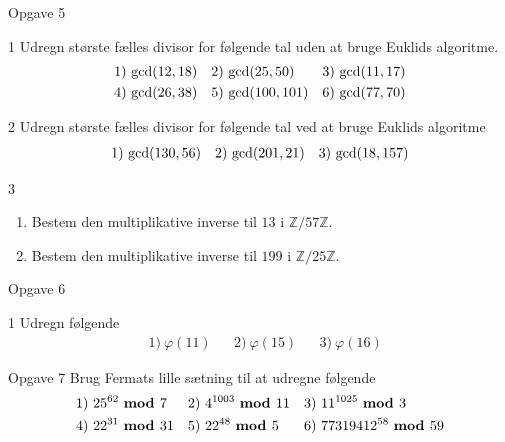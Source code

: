 \documentclass[12pt,x11names,a4paper]{article}
\begin{document}
%
%
%
%
%
\newpage
%
%
%
%
%
\begin{opgavetekst}{Opgave 5}
\end{opgavetekst}
\begin{delopgave}{1}
	Udregn største fælles divisor for følgende tal uden at bruge Euklids algoritme.
	\begin{align*}
		&1) \ \textnormal{gcd}(12,18)   &&2) \ \textnormal{gcd}(25,50)   &&3) \ \textnormal{gcd}(11,17)    \\
		&4) \ \textnormal{gcd}(26,38)   &&5) \ \textnormal{gcd}(100,101)    &&6) \ \textnormal{gcd}(77,70)   \\
	\end{align*}
\end{delopgave}
%
%
\begin{delopgave}{2}
	Udregn største fælles divisor for følgende tal ved at bruge Euklids algoritme
	\begin{align*}
		&1) \ \textnormal{gcd}(130,56)   &&2) \ \textnormal{gcd}(201,21)   &&3) \ \textnormal{gcd}(18,157)    \\
	\end{align*}
\end{delopgave}
%
%
\begin{delopgave}{3}
	\begin{enumerate}[label=\roman*)]
		\item Bestem den multiplikative inverse til $13$ i $\mathbb{Z}/57\mathbb{Z}$.
		\item Bestem den multiplikative inverse til $199$ i $\mathbb{Z}/25\mathbb{Z}$.
	\end{enumerate}
\end{delopgave}
%
%
%
%
%
\begin{opgavetekst}{Opgave 6}
\end{opgavetekst}
%
%
\begin{delopgave}{1}
	Udregn følgende
	\begin{align*}
		&1) \ \varphi(11)   &&2) \ \varphi(15)   &&3) \ \varphi(16)
	\end{align*}	 
\end{delopgave}
%
%
%
%
%
\begin{opgavetekst}{Opgave 7}
	Brug Fermats lille sætning til at udregne følgende
	\begin{align*}
		&1) \ 25^{62} \ \textbf{mod }{7}   &&2) \ 4^{1003} \ \textbf{mod }{11}   &&3) \ 11^{1025} \ \textbf{mod }{3} \\
		&4) \ 22^{31} \ \textbf{mod }{31}   &&5) \ 22^{48} \ \textbf{mod }{5}   &&6) \ 77319412^{58} \ \textbf{mod }{59}
	\end{align*}	 
\end{opgavetekst}
\end{document}
